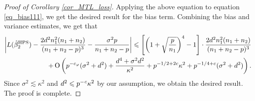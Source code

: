 \begin{proof}[Proof of Corollary \ref{cor_MTL_loss}]
Applying the above equation to equation \eqref{eq_bias111}, we get the desired result for the bias term.
Combining the bias and variance estimates, we get that
\begin{align*}
	\left|L(\hat{\beta}_2^{\textup{HPS}})  -  \frac{2d^2 n_1^2 (n_1+n_2)}{(n_1 + n_2 - p)^3} - \frac{\sigma^2 p}{n_1+n_2-p}   \right| \leqslant   \left[\left( 1+\sqrt{\frac{p}{n_1}}\right)^4-1\right] \cdot \frac{2d^2n_1^2 (n_1+n_2)}{(n_1 + n_2 - p)^3} \nonumber\\
+\operatorname{O}\left( p^{-c_\varphi} (\sigma^2 + d^2)+ \frac{d^4 + \sigma^2 d^2}{\kappa^2}+p^{-1/2+2c}\kappa^2 +  p^{-1/4+c} (\sigma^2 +d^2) \right).
\end{align*}
Since $\sigma^2 \lesssim  \kappa^2$ and $d^2 \leqslant p^{-{\mathit{c}}}{\kappa^2}$ by our assumption, we obtain the desired result.
The proof is complete.
\end{proof}
